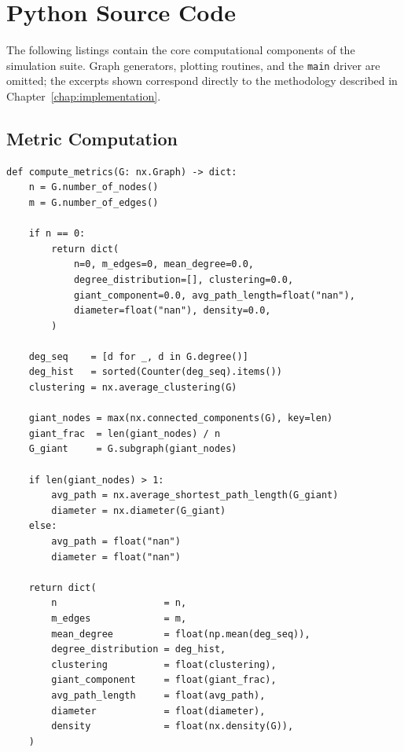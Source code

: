 \documentclass[12pt, a4paper]{report}
\theoremstyle{definition}
\theoremstyle{plain}
\theoremstyle{remark}
\begin{document}
\appendix

\chapter{Python Source Code}
\label{app:code}

The following listings contain the core computational components of the
simulation suite. Graph generators, plotting routines, and the
\texttt{main} driver are omitted; the excerpts shown correspond directly
to the methodology described in Chapter~\ref{chap:implementation}.

\section{Metric Computation}
\label{app:metrics}

\begin{lstlisting}[style=python,
    caption={Metric computation. Average path length and diameter are
      restricted to the largest connected component; both return
      \texttt{NaN} when that component contains only one node.},
    label={lst:metrics}]
def compute_metrics(G: nx.Graph) -> dict:
    n = G.number_of_nodes()
    m = G.number_of_edges()

    if n == 0:
        return dict(
            n=0, m_edges=0, mean_degree=0.0,
            degree_distribution=[], clustering=0.0,
            giant_component=0.0, avg_path_length=float("nan"),
            diameter=float("nan"), density=0.0,
        )

    deg_seq    = [d for _, d in G.degree()]
    deg_hist   = sorted(Counter(deg_seq).items())
    clustering = nx.average_clustering(G)

    giant_nodes = max(nx.connected_components(G), key=len)
    giant_frac  = len(giant_nodes) / n
    G_giant     = G.subgraph(giant_nodes)

    if len(giant_nodes) > 1:
        avg_path = nx.average_shortest_path_length(G_giant)
        diameter = nx.diameter(G_giant)
    else:
        avg_path = float("nan")
        diameter = float("nan")

    return dict(
        n                   = n,
        m_edges             = m,
        mean_degree         = float(np.mean(deg_seq)),
        degree_distribution = deg_hist,
        clustering          = float(clustering),
        giant_component     = float(giant_frac),
        avg_path_length     = float(avg_path),
        diameter            = float(diameter),
        density             = float(nx.density(G)),
    )
\end{lstlisting}
\end{document}
